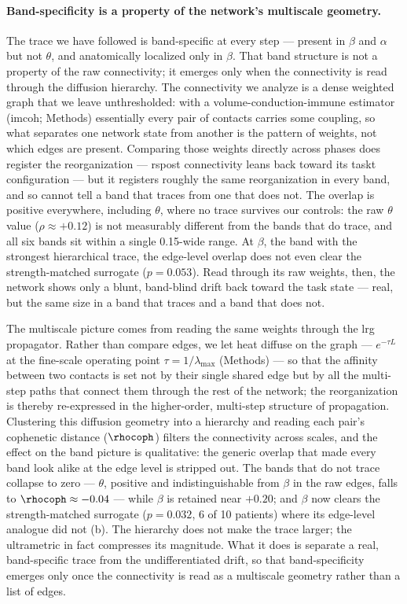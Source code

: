 \paragraph{Band-specificity is a property of the network's multiscale geometry.}
The trace we have followed is band-specific at every step --- present in \(\beta\) and \(\alpha\) but not \(\theta\), and anatomically localized only in \(\beta\). That band structure is not a property of the raw connectivity; it emerges only when the connectivity is read through the diffusion hierarchy. The connectivity we analyze is a dense weighted graph that we leave unthresholded: with a volume-conduction-immune estimator (\gls{imcoh}; Methods) essentially every pair of contacts carries some coupling, so what separates one network state from another is the pattern of weights, not which edges are present. Comparing those weights directly across phases does register the reorganization --- \acrshort{rspost} connectivity leans back toward its \acrshort{taskt} configuration --- but it registers roughly the same reorganization in every band, and so cannot tell a band that traces from one that does not. The overlap is positive everywhere, including \(\theta\), where no trace survives our controls: the raw \(\theta\) value (\(\rho \approx +0.12\)) is not measurably different from the bands that do trace, and all six bands sit within a single 0.15-wide range. At \(\beta\), the band with the strongest hierarchical trace, the edge-level overlap does not even clear the strength-matched surrogate (\(p = 0.053\)). Read through its raw weights, then, the network shows only a blunt, band-blind drift back toward the task state --- real, but the same size in a band that traces and a band that does not.

The multiscale picture comes from reading the same weights through the \gls{lrg} propagator. Rather than compare edges, we let heat diffuse on the graph --- \(e^{-\tau L}\) at the fine-scale operating point \(\tau = 1/\lambda_{\max}\) (Methods) --- so that the affinity between two contacts is set not by their single shared edge but by all the multi-step paths that connect them through the rest of the network; the reorganization is thereby re-expressed in the higher-order, multi-step structure of propagation. Clustering this diffusion geometry into a hierarchy and reading each pair's cophenetic distance (\(\rhocoph\)) filters the connectivity across scales, and the effect on the band picture is qualitative: the generic overlap that made every band look alike at the edge level is stripped out. The bands that do not trace collapse to zero --- \(\theta\), positive and indistinguishable from \(\beta\) in the raw edges, falls to \(\rhocoph \approx -0.04\) --- while \(\beta\) is retained near \(+0.20\); and \(\beta\) now clears the strength-matched surrogate (\(p = 0.032\), 6 of 10 patients) where its edge-level analogue did not (b). The hierarchy does not make the trace larger; the ultrametric in fact compresses its magnitude. What it does is separate a real, band-specific trace from the undifferentiated drift, so that band-specificity emerges only once the connectivity is read as a multiscale geometry rather than a list of edges.

